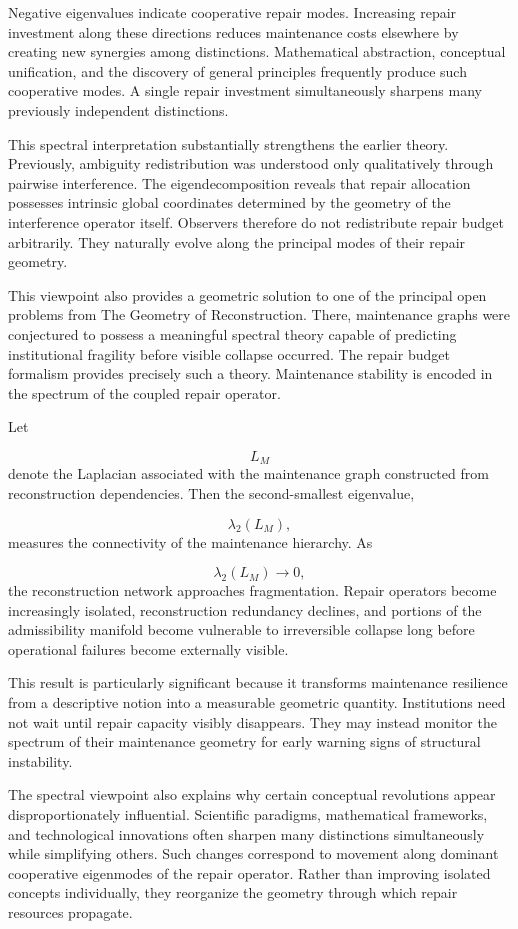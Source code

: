 \documentclass[12pt,oneside]{article}
\theoremstyle{plain}
\theoremstyle{definition}
\theoremstyle{remark}
\begin{document}
Negative eigenvalues indicate cooperative repair modes. Increasing repair investment along these directions reduces maintenance costs elsewhere by creating new synergies among distinctions. Mathematical abstraction, conceptual unification, and the discovery of general principles frequently produce such cooperative modes. A single repair investment simultaneously sharpens many previously independent distinctions.

This spectral interpretation substantially strengthens the earlier theory. Previously, ambiguity redistribution was understood only qualitatively through pairwise interference. The eigendecomposition reveals that repair allocation possesses intrinsic global coordinates determined by the geometry of the interference operator itself. Observers therefore do not redistribute repair budget arbitrarily. They naturally evolve along the principal modes of their repair geometry.

This viewpoint also provides a geometric solution to one of the principal open problems from The Geometry of Reconstruction. There, maintenance graphs were conjectured to possess a meaningful spectral theory capable of predicting institutional fragility before visible collapse occurred. The repair budget formalism provides precisely such a theory. Maintenance stability is encoded in the spectrum of the coupled repair operator.

Let

\[
L_M
\]
denote the Laplacian associated with the maintenance graph constructed from reconstruction dependencies. Then the second-smallest eigenvalue,

\[
\lambda_2(L_M),
\]
measures the connectivity of the maintenance hierarchy. As

\[
\lambda_2(L_M)
\rightarrow
0,
\]
the reconstruction network approaches fragmentation. Repair operators become increasingly isolated, reconstruction redundancy declines, and portions of the admissibility manifold become vulnerable to irreversible collapse long before operational failures become externally visible.

This result is particularly significant because it transforms maintenance resilience from a descriptive notion into a measurable geometric quantity. Institutions need not wait until repair capacity visibly disappears. They may instead monitor the spectrum of their maintenance geometry for early warning signs of structural instability.

The spectral viewpoint also explains why certain conceptual revolutions appear disproportionately influential. Scientific paradigms, mathematical frameworks, and technological innovations often sharpen many distinctions simultaneously while simplifying others. Such changes correspond to movement along dominant cooperative eigenmodes of the repair operator. Rather than improving isolated concepts individually, they reorganize the geometry through which repair resources propagate.
\end{document}
